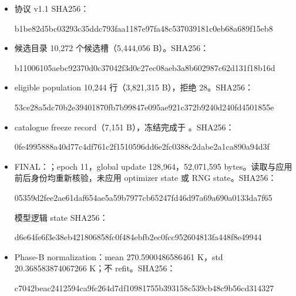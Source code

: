 \documentclass[UTF8,11pt,a4paper,fontset=windows]{ctexart}
\begin{document}
\begin{itemize}
\item 协议 v1.1 SHA256：
\par{\small\ttfamily b1be82d5bc03293c35ddc793faa1187e97fa48c537039181c0eb68a689f15eb8}\par
\item 候选目录 10,272 个候选槽（5,444,056 B）。SHA256：
\par{\small\ttfamily b11006105aebc92370d0c37042f3d0c27ec08aeb3a8b602987c62d131f18b16d}\par
\item eligible population 10,244 行（3,821,315 B），拒绝 28。SHA256：
\par{\small\ttfamily 53ce28a5dc70b2e39401870fb7b99847e095ae921c372b9240d240fd4501855e}\par
\item catalogue freeze record（7,151 B），冻结完成于 。SHA256：
\par{\small\ttfamily 0fe4995888a40d77c4df761c2f1510596dd6e2fc0388c2dabe2a1ca890a94d3f}\par
\item FINAL：；epoch 11，global update 128,964，52,071,595 bytes。读取与应用前后身份均重新核验，未应用 optimizer state 或 RNG state。SHA256：
\par{\small\ttfamily 05359d2fee2ae61daf654ae5a59b7977cb65247fd46d97a69a690a0133da7f65}\par
模型逻辑 state SHA256：
\par{\small\ttfamily d6e64fe6f3e38eb421806858fc0f484ebfb2ec0fcc952604813fa448f8e49944}\par
\item Phase-B normalization：mean 270.5900486586461 K，std 20.368583874067266 K；不 refit。SHA256：
\par{\small\ttfamily c7042beac2412594ca9fc264d7df10981755b393158c539cb48c9b56cd314327}\par
\end{itemize}
\end{document}
